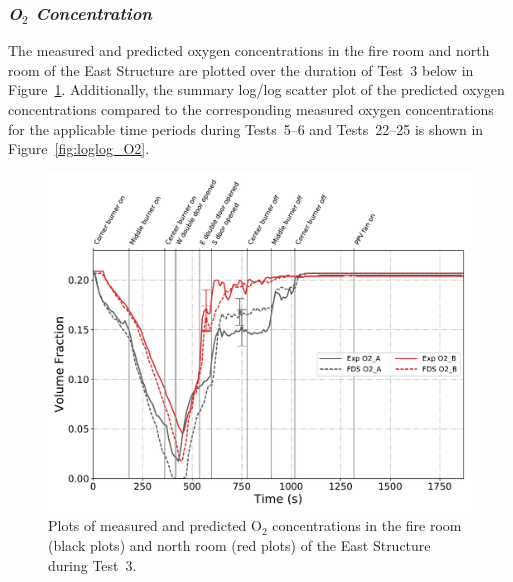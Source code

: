 \subsubsection*{\textit{O$_2$ Concentration}}
The measured and predicted oxygen concentrations in the fire room and north room of the East Structure are plotted over the duration of Test~3 below in Figure~\ref{fig:Test3_O2}. Additionally, the summary log/log scatter plot of the predicted oxygen concentrations compared to the corresponding measured oxygen concentrations for the applicable time periods during Tests~5--6 and Tests~22--25 is shown in Figure~\ref{fig:loglog_O2}.
\begin{figure}[!h]
	\centering
	\includegraphics[width=\columnwidth]{Figures/Plots/Validation/Gas_Concentration/Test_3_O2}
	\caption[Plots of measured and predicted O$_2$ concentration during Test~3.]{Plots of measured and predicted O$_2$ concentrations in the fire room (black plots) and north room (red plots) of the East Structure during Test~3.}
	\label{fig:Test3_O2}
\end{figure}

